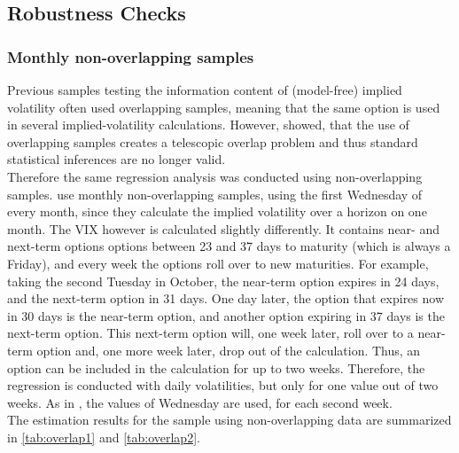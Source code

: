 %
\label{tab:newey2}



\subsection{Robustness Checks}\label{sec51Robustness}

\subsubsection{Monthly non-overlapping samples}
Previous samples testing the information content of (model-free) implied volatility often used overlapping samples, meaning that the same option is used in several implied-volatility calculations. However, \textcite{christensen1998} showed, that the use of overlapping samples creates a telescopic overlap problem and thus standard statistical inferences are no longer valid.\\
Therefore the same regression analysis was conducted using non-overlapping samples. \textcite{jiang2003} use monthly non-overlapping samples, using the first Wednesday of every month, since they calculate the implied volatility over a horizon on one month. The VIX however is calculated slightly differently. It contains near- and next-term options options between 23 and 37 days to maturity (which is always a Friday), and every week the options roll over to new maturities. For example, taking the second Tuesday in October, the near-term option expires in 24 days, and the next-term option in 31 days. One day later, the option that expires now in 30 days is the near-term option, and another option expiring in 37 days is the next-term option. This next-term option will, one week later, roll over to a near-term option and, one more week later, drop out of the calculation. Thus, an option can be included in the calculation for up to two weeks. Therefore, the regression is conducted with daily volatilities, but only for one value out of two weeks. As in \textcite{jiang2003}, the values of Wednesday are used, for each second week. \\
The estimation results for the sample using non-overlapping data are summarized in \ref{tab:overlap1} and \ref{tab:overlap2}.




\newpage

















